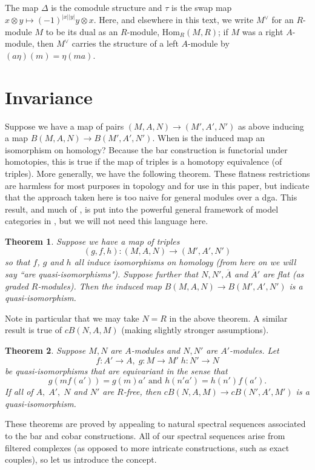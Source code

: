 \documentclass{memo-l}
\newtheorem{theorem}{Theorem}[chapter]
\theoremstyle{definition}
\theoremstyle{remark}
\numberwithin{section}{chapter}
\numberwithin{equation}{chapter}
\begin{document}
The map $\Delta$ is the comodule structure and $\tau$ is the swap map $x \otimes y \mapsto (-1)^{|x||y|} y \otimes x$. Here, and elsewhere in this text, we write $M^\vee$ for an $R$-module $M$ to be its dual as an $R$-module, $\text{Hom}_R(M, R)$; if $M$ was a right $A$-module, then $M^\vee$ carries the structure of a left $A$-module by $(a \eta)(m) = \eta(ma)$. 

\section{Invariance}
Suppose we have a map of pairs $(M,A,N) \to (M',A',N')$ as above inducing a map $B(M,A,N) \to B(M',A',N')$. When is the induced map an isomorphism on homology? Because the bar construction is functorial under homotopies, this is true if the map of triples is a homotopy equivalence (of triples). More generally, we have the following theorem. These flatness restrictions are harmless for most purposes in topology and for use in this paper, but indicate that the approach taken here is too naive for general modules over a dga. This result, and much of \cite{GM}, is put into the powerful general framework of model categories in \cite{barthel2014six}, but we will not need this language here.

\begin{theorem}\label{bar-inv}Suppose we have a map of triples 
$$(g,f,h): (M,A,N) \to (M',A',N')$$ 
so that $f$, $g$ and $h$ all induce isomorphisms on homology (from here on we will say ``are quasi-isomorphisms"). Suppose further that $N, N', \overline A$ and $\overline A'$ are flat (as graded $R$-modules). Then the induced map $B(M,A,N) \to B(M',A',N')$ is a quasi-isomorphism.
\end{theorem}

Note in particular that we may take $N = R$ in the above theorem. A similar result is true of $cB(N,A,M)$ (making slightly stronger assumptions). 

\begin{theorem}\label{cb-inv}Suppose $M,N$ are $A$-modules and $N, N'$ are $A'$-modules. Let 
$$f: A' \to A, \;g: M \to M' \; h: N' \to N$$ 
be quasi-isomorphisms that are equivariant in the sense that 
$$g(mf(a')) = g(m)a' \text{ and } h(n'a') = h(n')f(a').$$
If all of $A, \; A', \; N$ and $N'$ are $R$-free, then $cB(N,A,M) \to cB(N',A',M')$ is a quasi-isomorphism.
\end{theorem}

These theorems are proved by appealing to natural spectral sequences associated to the bar and cobar constructions. All of our spectral sequences arise from filtered complexes (as opposed to more intricate constructions, such as exact couples), so let us introduce the concept. 
\end{document}
